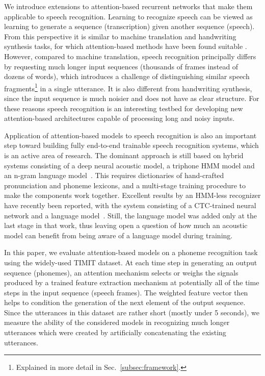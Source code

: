\documentclass{article}
\begin{document}
We introduce extensions to attention-based recurrent networks
that make them applicable to
speech recognition. Learning to recognize speech can be viewed as
learning to generate a sequence (transcription) given another sequence (speech).
From this perspective it is similar to machine translation and handwriting
synthesis tasks, for which attention-based methods have been found suitable
\cite{bahdanau_neural_2014,graves_generating_2013}.  However, compared to
machine translation, speech recognition principally differs by
requesting much longer input
sequences (thousands of frames instead of dozens of words), which introduces a
challenge of distinguishing similar speech fragments\footnote{Explained in
more detail in Sec.~\ref{subsec:framework}.} in a single utterance.
It is
also different from handwriting synthesis, since the input sequence is much
noisier and does not have as clear structure. For these reasons speech
recognition is an interesting testbed for developing new attention-based
architectures capable of processing long and noisy inputs.


Application of attention-based models to speech recognition is also an
important step toward building fully end-to-end trainable speech
recognition systems, which is an active area of research. The dominant
approach is still based
on hybrid systems consisting of a deep neural acoustic model, a triphone HMM
model and an n-gram language
model~\cite{gales_application_2007,hinton_deep_2012}. This requires dictionaries
of hand-crafted pronunciation and phoneme lexicons, and a multi-stage training
procedure to make the components work together. Excellent results by an HMM-less
recognizer have recently been reported, with the system consisting of a
CTC-trained neural network and a language model~\cite{hannun2014_deepspeech}.
Still, the language model was added only at the last stage in that work, thus
leaving open a question of how much an acoustic model can benefit from being
aware of a language model during training.


In this paper, we evaluate attention-based models on a
phoneme recognition task using the widely-used TIMIT
dataset. At each time step in generating an output sequence (phonemes),
an attention mechanism selects or weighs the signals produced
by a trained feature extraction mechanism at potentially all of the time steps 
in the input sequence (speech frames). The weighted feature vector then
helps to condition the generation of the next element of the output sequence.
Since the utterances in this dataset are rather
short (mostly under 5 seconds), we measure the
ability of the considered models in recognizing much longer
utterances which were created by artificially concatenating
the existing utterances.
\end{document}
